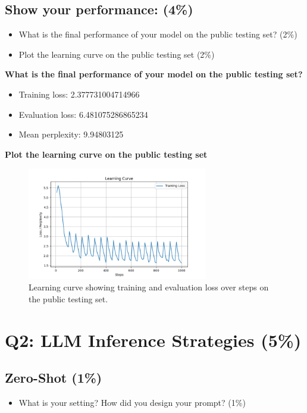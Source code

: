 \documentclass{article}
\begin{document}
\newpage

\subsection{Show your performance: (4\%)}
\begin{itemize}
    \item What is the final performance of your model on the public testing set? (2\%)
    \item Plot the learning curve on the public testing set (2\%)
\end{itemize}

\textbf{What is the final performance of your model on the public testing set?}
\begin{itemize}
    \item Training loss: 2.377731004714966
    \item Evaluation loss: 6.481075286865234
    \item Mean perplexity: 9.94803125
\end{itemize}

\textbf{Plot the learning curve on the public testing set}
\begin{figure}[h!]
    \centering
    \includegraphics[width=0.7\textwidth]{learning_curve.png}
    \caption{Learning curve showing training and evaluation loss over steps on the public testing set.}
    \label{fig:learning_curve}
\end{figure}

\newpage

\section{Q2: LLM Inference Strategies (5\%)}
\subsection{Zero-Shot (1\%)}
\begin{itemize}
    \item What is your setting? How did you design your prompt? (1\%)
\end{itemize}
\end{document}
